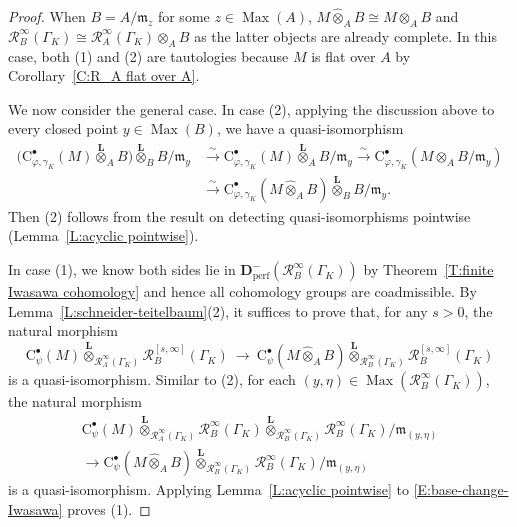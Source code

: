 \documentclass[12pt]{article}
\theoremstyle{definition}
\numberwithin{equation}{theorem}
\newcommand{\calR}{\mathcal{R}}
\newcommand{\gothm}{\mathfrak{m}}
\newcommand{\bbD}{\mathbf{D}}
\newcommand{\bbL}{\mathbf{L}}
\newcommand{\rmC}{\mathrm{C}}
\newcommand{\perf}{\mathrm{perf}}
\DeclareMathOperator{\Max}{Max}
\begin{document}
\begin{proof}
When $B = A/\gothm_z$ for some $z \in \Max(A)$, $M \widehat \otimes_A B \cong M \otimes_A B$ and $\calR_B^\infty(\Gamma_K) \cong \calR_A^\infty(\Gamma_K)\otimes_AB$ as the latter objects are already complete.  In this case, both (1) and (2) are tautologies because $M$ is flat over $A$ by Corollary~\ref{C:R_A flat over A}.

We now consider the general case.
In case (2), applying the discussion above to every closed point $y \in \Max(B)$, we have a quasi-isomorphism
\begin{align*}
\big(\rmC^\bullet_{\varphi, \gamma_K}(M) \stackrel{\bbL}\otimes_A B\big)\stackrel{\bbL}\otimes_B B/\gothm_y &\xrightarrow\sim \rmC^\bullet_{\varphi, \gamma_K}(M) \stackrel{\bbL}\otimes_A B/\gothm_y
\xrightarrow \sim
\rmC^\bullet_{\varphi, \gamma_K}(M  \otimes_A B/\gothm_y)\\
&\xrightarrow \sim
\rmC^\bullet_{\varphi, \gamma_K}(M \widehat \otimes_A B)\stackrel{\bbL}\otimes_B B/\gothm_y.
\end{align*}
Then (2) follows from the result on detecting quasi-isomorphisms pointwise (Lemma~\ref{L:acyclic pointwise}).

In case (1), we know both sides lie in $\bbD_\perf^- (\calR_B^\infty(\Gamma_K))$ by Theorem~\ref{T:finite Iwasawa cohomology} and hence all cohomology groups are coadmissible.  By Lemma~\ref{L:schneider-teitelbaum}(2), it suffices to prove that, for any $s>0$, the natural morphism
\begin{equation}
\label{E:base-change-Iwasawa}
\rmC^\bullet_\psi(M) \stackrel{\bbL}\otimes_{\calR_A^\infty(\Gamma_K)} \calR_B^{[s,\infty]}(\Gamma_K) \ \longrightarrow\ \rmC^\bullet_\psi(M \widehat \otimes_A B)\stackrel{\bbL}\otimes_{\calR_B^\infty(\Gamma_K)} \calR_B^{[s,\infty]}(\Gamma_K)
\end{equation}
is a quasi-isomorphism. Similar to (2), for each $(y,\eta) \in \Max(\calR_B^\infty(\Gamma_K))$, the natural morphism
\begin{multline*}
\rmC^\bullet_\psi(M)
  \stackrel{\bbL}\otimes_{ \calR_A^\infty(\Gamma_K)}
    \calR_B^\infty(\Gamma_K)
  \stackrel{\bbL}\otimes_{ \calR_B^\infty(\Gamma_K)}
    \calR_B^\infty(\Gamma_K)/\gothm_{(y,\eta)} \\
\longrightarrow
\rmC^\bullet_\psi(M \widehat \otimes_A B)
  \stackrel{\bbL}\otimes_{ \calR_B^\infty(\Gamma_K)}
    \calR_B^\infty(\Gamma_K)/\gothm_{(y,\eta)}
\end{multline*}
is a quasi-isomorphism.  Applying Lemma~\ref{L:acyclic pointwise} to
\eqref{E:base-change-Iwasawa} proves (1).
\end{proof}
\end{document}
